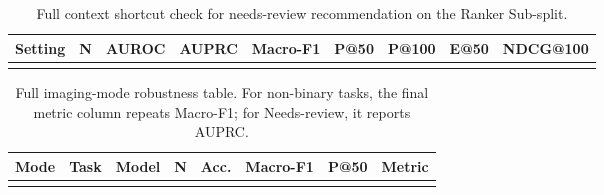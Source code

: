 \documentclass{article}
\begin{document}
\begin{table}[h]
\centering
\caption{Full event representation analysis for needs-review recommendation using a CLIP logistic probe. Auto-pass is reported at 95\% needs-review recall.}
\label{tab:event_rep_ablation_full}
\small
\setlength{\tabcolsep}{3pt}
\end{table}



\begin{table}[h]
\centering
\caption{Full context shortcut check for needs-review recommendation on the Ranker Sub-split.}
\label{tab:context_shortcut_full}
\small
\setlength{\tabcolsep}{4pt}
\begin{tabular}{lrrrrrrrr}
\toprule
Setting & N & AUROC & AUPRC & Macro-F1 & P@50 & P@100 & E@50 & NDCG@100 \\
\midrule
\\
\bottomrule
\end{tabular}
\end{table}







\begin{table}[h]
\centering
\caption{Full imaging-mode robustness table. For non-binary tasks, the final metric column repeats Macro-F1; for Needs-review, it reports AUPRC.}
\label{tab:robustness_audits}
\small
\begin{tabular}{lllrrrrr}
\toprule
Mode & Task & Model & N & Acc. & Macro-F1 & P@50 & Metric \\
\midrule
\\
\bottomrule
\end{tabular}
\end{table}
\end{document}
